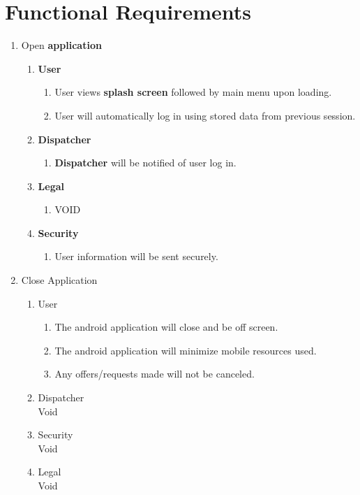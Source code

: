 \documentclass[english]{article}
\begin{document}

\section{Functional Requirements}
\label{sec:functional_requirements}

\begin{enumerate}[{BE}1.]
	\item Open \textbf{application}
	\begin{enumerate}[{VP1}.1]
		\item \textbf{User}
			\begin{enumerate}
				\item User views \textbf{splash screen} followed by main menu upon loading.
				\item User will automatically log in using stored data from previous session.
			\end{enumerate}
		\item \textbf{Dispatcher}
			\begin{enumerate}
				\item \textbf{Dispatcher} will be notified of user log in. 
			\end{enumerate}
		\item \textbf{Legal}
			\begin{enumerate}
			\item VOID
			\end{enumerate}
		\item \textbf{Security}
			\begin{enumerate}
			\item User information will be sent securely.
			\end{enumerate}
	\end{enumerate}

	\item Close Application
	\begin{enumerate}[{VP2}.1]
		\item User
			\begin{enumerate}
				\item The android application will close and be off screen.
				\item The android application will minimize mobile resources used.
				\item Any offers/requests made will not be canceled.
			\end{enumerate}
		\item Dispatcher\\
			Void
		\item Security\\
			Void
		\item Legal\\
			Void
	\end{enumerate}


\end{enumerate}
\end{document}
